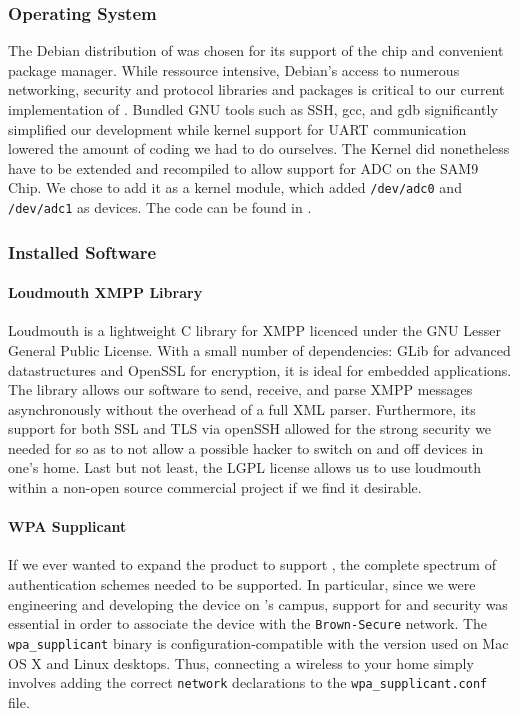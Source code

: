 \subsubsection{Operating System}
The Debian distribution of \glinux was chosen for its support of the \arm chip and convenient package manager. While ressource intensive, Debian's access to numerous networking, security and protocol libraries and packages is critical to our current implementation of \netlets . Bundled GNU tools such as SSH, gcc, and gdb significantly simplified our development while \glinux kernel support for UART communication lowered the amount of coding we had to do ourselves. The Kernel did nonetheless have to be extended and recompiled to allow support for ADC on the SAM9 Chip. We chose to add it as a kernel module, which added \texttt{/dev/adc0} and \texttt{/dev/adc1} as devices. The code can be found in .\\

\subsubsection{Installed Software}

\paragraph{Loudmouth XMPP Library} Loudmouth is a lightweight C library for XMPP licenced under the GNU Lesser General Public License. With a small number of dependencies: GLib for advanced datastructures and OpenSSL for encryption, it is ideal for embedded applications. The library allows our software to send, receive, and parse XMPP messages asynchronously without the overhead of a full XML parser. Furthermore, its support for both SSL and TLS via openSSH allowed for the strong security we needed for \netlets so as to not allow a possible hacker to switch on and off devices in one's home. Last but not least, the LGPL license allows us to use loudmouth within a non-open source commercial project if we find it desirable.

\paragraph{WPA Supplicant} If we ever wanted to expand the \netlet product to support \wifi, the complete spectrum of authentication schemes needed to be supported.  In particular, since we were engineering and developing the device on \brown's campus, support for \wifix and \wpae security was essential in order to associate the device with the \texttt{Brown-Secure} network.  The \texttt{wpa\_supplicant} binary is configuration-compatible with the version used on Mac OS X and Linux desktops.  Thus, connecting a wireless \netlet to your home \wifi simply involves adding the correct \texttt{network} declarations to the \texttt{wpa\_supplicant.conf} file.

